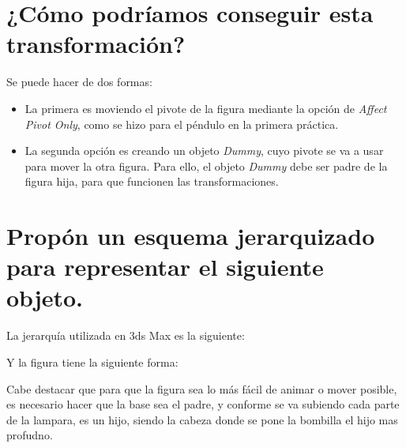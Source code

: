 \documentclass{article}
\begin{document}

\section{¿Cómo podríamos conseguir esta transformación?}


Se puede hacer de dos formas:

\begin{itemize}
    \item La primera es moviendo el pivote de la figura mediante la opción de \textit{Affect Pivot Only}, como se hizo para el péndulo en la primera práctica.
    
    
    \item La segunda opción es creando un objeto \textit{Dummy}, cuyo pivote se va a usar para mover la otra figura. Para ello, el objeto \textit{Dummy} debe ser padre de la figura hija, para que funcionen las transformaciones.
\end{itemize}

\section{Propón un esquema jerarquizado para representar el siguiente objeto.}


La jerarquía utilizada en 3ds Max es la siguiente:


Y la figura tiene la siguiente forma:


Cabe destacar que para que la figura sea lo más fácil de animar o mover posible, es necesario hacer que la base sea el padre, y conforme se va subiendo cada parte de la lampara, es un hijo, siendo la cabeza donde se pone la bombilla el hijo mas profudno.
\end{document}
